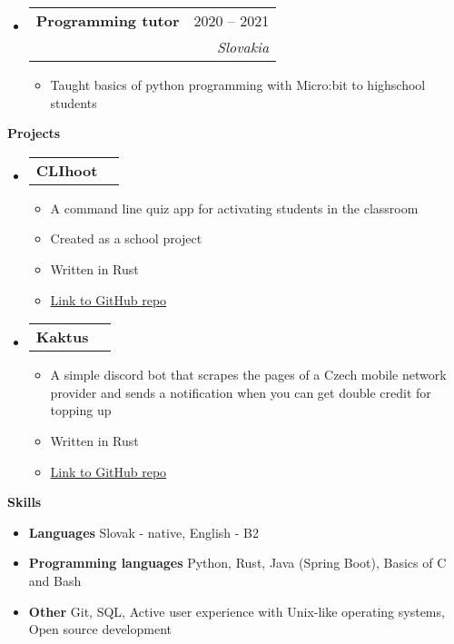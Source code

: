 \documentclass[letterpaper,12pt]{article}[leftmargin=*]
\makeatletter
\def \entryspacing {-0pt}
\renewcommand{\section}[2]{\vspace{5pt}
  \colorbox{secondary}{\color{white}\raggedbottom\normalsize\textbf{{#1}{\hspace{7pt}#2}}}
}
\newcommand{\resumeEntryStart}{\begin{itemize}[leftmargin=2.5mm]}
\newcommand{\resumeEntryEnd}{\end{itemize}\vspace{\entryspacing}}
\newcommand{\resumeItemListStart}{\begin{itemize}[leftmargin=4.5mm]}
\newcommand{\resumeItemListEnd}{\end{itemize}}
\newcommand{\resumeItem}[1]{
  \item\small{
    {#1 \vspace{-2pt}}
  }
}
\newcommand{\resumeEntryTSDL}[4]{
  \vspace{-1pt}\item[]
    \begin{tabularx}{0.97\textwidth}{X@{\hspace{60pt}}r}
      \textbf{\color{primary}#1} & {\firabook\color{accent}\small#2} \\
      \textit{\color{accent}\small#3} & \textit{\color{accent}\small#4} \\
    \end{tabularx}\vspace{-6pt}
}
\newcommand{\resumeEntryTD}[2]{
  \vspace{-1pt}\item[]
    \begin{tabularx}{0.97\textwidth}{X@{\hspace{60pt}}r}
      \textbf{\color{primary}#1} & {\firabook\color{accent}\small#2} \\
    \end{tabularx}\vspace{-6pt}
}
\newcommand{\resumeEntryS}[2]{
  \item[]\small{
    \textbf{\color{primary}#1 }{ #2 \vspace{-6pt}}
  }
}
\makeatother
\begin{document}
  \resumeEntryStart
    \resumeEntryTSDL
      {Programming tutor}{2020 -- 2021}
      {}{Slovakia}
    \resumeItemListStart
      \resumeItem {Taught basics of python programming with Micro:bit to highschool students}
    \resumeItemListEnd
  \resumeEntryEnd

\def \clihoot {\href{https://github.com/Pederrr/clihoot}{Link to GitHub repo}}
\def \kaktus {\href{https://github.com/Pederrr/Kaktus}{Link to GitHub repo}}


\section{\faFlask}{Projects}

  \resumeEntryStart
    \resumeEntryTD
      {CLIhoot}{}
    \resumeItemListStart
      \resumeItem {A command line quiz app for activating students in the classroom}
      \resumeItem {Created as a school project}
      \resumeItem {Written in Rust}
      \resumeItem {\clihoot}
    \resumeItemListEnd
    \resumeEntryTD
      {Kaktus}{}
    \resumeItemListStart
      \resumeItem {A simple discord bot that scrapes the pages of a Czech mobile network provider and sends a notification when you can get double credit for topping up}
      \resumeItem {Written in Rust}
      \resumeItem {\kaktus}
    \resumeItemListEnd
  \resumeEntryEnd

\section{\faGears}{Skills}
 \resumeEntryStart
  \resumeEntryS{Languages } {Slovak - native, English - B2}
  \resumeEntryS{Programming languages } {Python, Rust, Java (Spring Boot), Basics of C and Bash}
  \resumeEntryS{Other } {Git, SQL,  Active user experience with Unix-like operating systems, Open source development}
 \resumeEntryEnd
\end{document}
